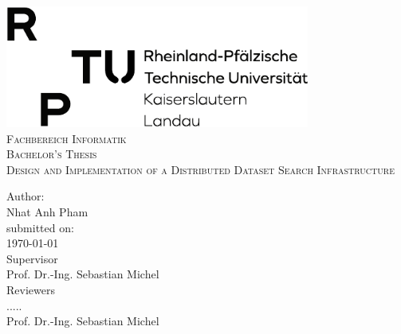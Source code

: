 \documentclass[a4paper]{report}
\author{}
\date{\today}
\begin{document}
\pagestyle{empty}
\begin{titlepage}
\begin{center}
	\includegraphics[width=10cm,clip,trim=0 0 0 0\textwidth]{rptu}\\[2cm]
  \textsc{\large Fachbereich Informatik}\\[1.5cm]
	\vfill
  \textsc{\Large Bachelor's Thesis}\\[0.5cm]
{
  \linespread{1.0}\selectfont
{\LARGE   \textsc{Design and Implementation of a Distributed Dataset Search Infrastructure}\\[2cm]}
}

  { \Large
  Author:\\
	Nhat Anh Pham\\[2cm]
  {\small submitted on: \\
  \today}
  }\\[1cm]

  Supervisor\\
Prof. Dr.-Ing. Sebastian Michel\\[2cm]

  Reviewers\\
.....\\
  Prof. Dr.-Ing. Sebastian Michel\\

  
\end{center}
\end{titlepage}

%
\cleardoublepage
\end{document}

